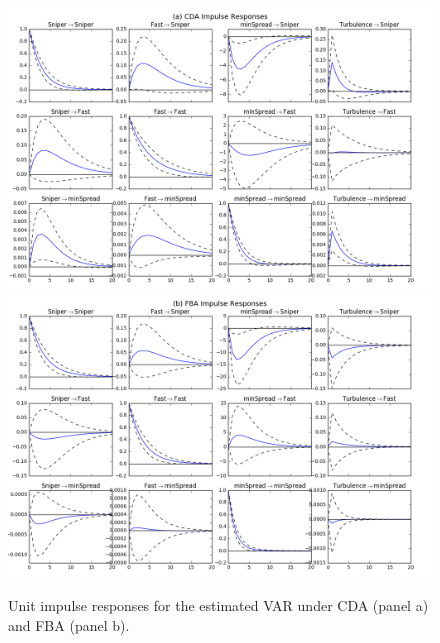 \documentclass[12pt]{article}
\begin{document}
\begin{figure}
\begin{center}
\includegraphics[width=\textwidth]{img/irfCDA.png}
\includegraphics[width=\textwidth]{img/irfFBA.png}
\caption{Unit impulse responses for the estimated VAR under CDA (panel a) and FBA (panel b).}
\label{fig:irfs}
\end{center}
\end{figure}
\end{document}
